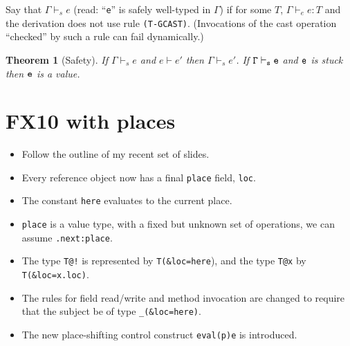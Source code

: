 \documentclass[nocopyrightspace,preprint,10pt]{sigplanconf}
\newtheorem{theorem}{Theorem}[section]
\newcommand\FXten{{\sf FX10}}
\begin{document}
Say that $\Gamma \vdash_s e$ (read: ``{\tt e}'' is safely well-typed in $\Gamma$) if
for some $T$, $\Gamma \vdash_e e:T$ and the derivation does not use rule
{\tt \sc (T-GCAST)}. (Invocations of the cast operation ``checked'' by such a rule can fail
dynamically.) 

\begin{theorem}[Safety] If $\Gamma \vdash_s  e$ and $e \vdash e'$ then
$\Gamma \vdash_s e'$. If $\tt \Gamma \vdash_s e$ and $\tt e$ is stuck then $\tt e$ is a value.
\end{theorem}

\section{\FXten{} with places}

{\em
  \begin{itemize}
    \item Follow the outline of my recent set of slides.
    \item Every reference object now has a final {\tt place} field, {\tt loc}.
    \item The constant {\tt here} evaluates to the current place.
    \item {\tt place} is a value type, with a fixed but unknown set of
      operations, we can assume {\tt .next:place}.
    \item The type {\tt T@!} is represented by {\tt T(\&loc=here}), and
      the type {\tt T@x} by {\tt T(\&loc=x.loc)}.
    \item The rules for field read/write and method invocation are changed to require that
      the subject be of type {\tt \_(\&loc=here)}.
    \item The new place-shifting control construct {\tt eval(p)e} is introduced.
  \end{itemize}
}





\balance
\appendix
\onecolumn
\end{document}
